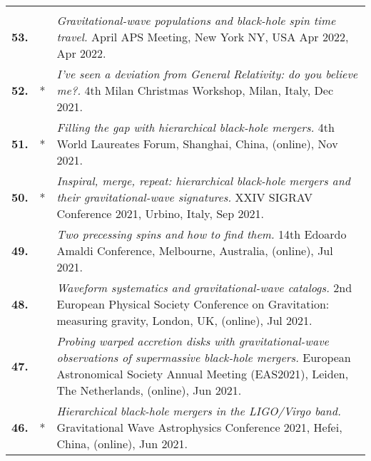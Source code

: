 {\begin{longtable}{rp{0.3cm}p{15.8cm}}
\vspace{0.05cm}\\
%
\textbf{53.} &  & \textit{Gravitational-wave populations and black-hole spin time travel.}
\newline{}
April APS Meeting, New York NY, USA Apr 2022, Apr 2022.
\vspace{0.05cm}\\
%
\textbf{52.} & * & \textit{I've seen a deviation from General Relativity: do you believe me?.}
\newline{}
4th Milan Christmas Workshop, Milan, Italy, Dec 2021.
\vspace{0.05cm}\\
%
\textbf{51.} & * & \textit{Filling the gap with hierarchical black-hole mergers.}
\newline{}
4th World Laureates Forum, Shanghai, China, (online), Nov 2021.
\vspace{0.05cm}\\
%
\textbf{50.} & * & \textit{Inspiral, merge, repeat: hierarchical black-hole mergers and their gravitational-wave signatures.}
\newline{}
XXIV SIGRAV Conference 2021, Urbino, Italy, Sep 2021.
\vspace{0.05cm}\\
%
\textbf{49.} &  & \textit{Two precessing spins and how to find them.}
\newline{}
14th Edoardo Amaldi Conference, Melbourne, Australia, (online), Jul 2021.
\vspace{0.05cm}\\
%
\textbf{48.} &  & \textit{Waveform systematics and gravitational-wave catalogs.}
\newline{}
2nd European Physical Society Conference on Gravitation: measuring gravity, London, UK, (online), Jul 2021.
\vspace{0.05cm}\\
%
\textbf{47.} &  & \textit{Probing warped accretion disks with gravitational-wave observations of supermassive black-hole mergers.}
\newline{}
European Astronomical Society Annual Meeting (EAS2021), Leiden, The Netherlands, (online), Jun 2021.
\vspace{0.05cm}\\
%
\textbf{46.} & * & \textit{Hierarchical black-hole mergers in the LIGO/Virgo band.}
\newline{}
Gravitational Wave Astrophysics Conference 2021, Hefei, China, (online), Jun 2021.
\vspace{0.05cm}\\

\end{longtable}}
